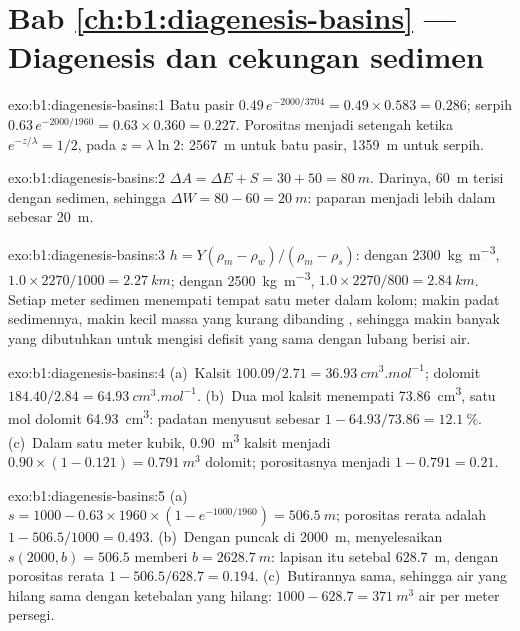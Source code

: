 \section*{Bab \ref{ch:b1:diagenesis-basins} --- Diagenesis dan cekungan sedimen}

\begin{solution}{exo:b1:diagenesis-basins:1}
Batu pasir $0.49\,e^{-2000/3704} = 0.49\times0.583 = \num{0.286}$; serpih
$0.63\,e^{-2000/1960} = 0.63\times0.360 = \num{0.227}$. Porositas menjadi setengah
ketika $e^{-z/\lambda} = 1/2$, pada $z = \lambda\ln 2$: \qty{2567}{m} untuk batu pasir,
\qty{1359}{m} untuk serpih.
\end{solution}

\begin{solution}{exo:b1:diagenesis-basins:2}
$\Delta A = \Delta E + S = 30 + 50 = \qty{80}{m}$. Darinya, \qty{60}{m} terisi dengan
sedimen, sehingga $\Delta W = 80 - 60 = \qty{20}{m}$: paparan menjadi lebih dalam
sebesar \qty{20}{m}.
\end{solution}

\begin{solution}{exo:b1:diagenesis-basins:3}
$h = Y(\rho_m - \rho_w)/(\rho_m - \rho_s)$: dengan \qty{2300}{kg.m^{-3}},
$1.0\times2270/1000 = \qty{2.27}{km}$; dengan \qty{2500}{kg.m^{-3}},
$1.0\times2270/800 = \qty{2.84}{km}$. Setiap meter sedimen menempati tempat satu meter
 dalam kolom; makin padat sedimennya, makin kecil massa yang kurang dibanding
, sehingga makin banyak yang dibutuhkan untuk mengisi defisit yang sama dengan
lubang berisi air.
\end{solution}

\begin{solution}{exo:b1:diagenesis-basins:4}
(a)~Kalsit $100.09/2.71 = \qty{36.93}{cm^3.mol^{-1}}$; dolomit $184.40/2.84
= \qty{64.93}{cm^3.mol^{-1}}$. (b)~Dua mol kalsit menempati \qty{73.86}{cm^3}, satu mol
dolomit \qty{64.93}{cm^3}: padatan menyusut sebesar $1 - 64.93/73.86 = \qty{12.1}{\%}$.
(c)~Dalam satu meter kubik, \qty{0.90}{m^3} kalsit menjadi $0.90\times(1 - 0.121) = \qty{0.791}{m^3}$ dolomit; porositasnya menjadi $1 - 0.791 = \num{0.21}$.
\end{solution}

\begin{solution}{exo:b1:diagenesis-basins:5}
(a)~$s = 1000 - 0.63\times1960\times(1 - e^{-1000/1960}) = \qty{506.5}{m}$; porositas
rerata adalah $1 - 506.5/1000 = \num{0.493}$. (b)~Dengan puncak di \qty{2000}{m},
menyelesaikan $s(2000, b) = 506.5$ memberi $b = \qty{2628.7}{m}$: lapisan itu setebal
\qty{628.7}{m}, dengan porositas rerata $1 - 506.5/628.7 = \num{0.194}$. (c)~Butirannya
sama, sehingga air yang hilang sama dengan ketebalan yang hilang: $1000 - 628.7 = \qty{371}{m^3}$ air per meter persegi.
\end{solution}

